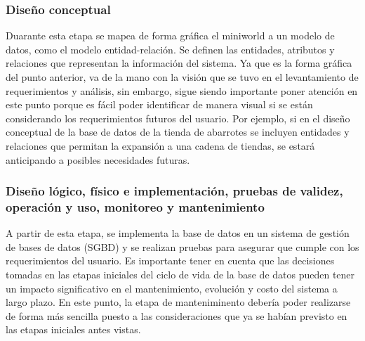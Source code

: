 \vspace{0.3cm}

\subsubsection*{\textcolor{unamblue}{Diseño conceptual}}
Duarante esta etapa se mapea de forma gráfica el miniworld a un modelo de datos, como el modelo entidad-relación. Se definen las entidades, atributos y relaciones que representan la información del sistema.
Ya que es la forma gráfica del punto anterior, va de la mano con la visión que se tuvo en el levantamiento de requerimientos y análisis, sin embargo, sigue siendo importante poner atención en este punto porque es fácil
poder identificar de manera visual si se están considerando los requerimientos futuros del usuario. Por ejemplo, si en el diseño conceptual de la base de datos de la tienda de abarrotes se incluyen entidades y relaciones
que permitan la expansión a una cadena de tiendas, se estará anticipando a posibles necesidades futuras.

 \vspace{0.3cm}

\subsubsection*{\textcolor{unamblue}{Diseño lógico, físico e implementación, pruebas de validez, operación y uso, monitoreo y mantenimiento}}
A partir de esta etapa, se implementa la base de datos en un sistema de gestión de bases de datos (SGBD) y se realizan pruebas para asegurar que cumple con los requerimientos del usuario.
Es importante tener en cuenta que las decisiones tomadas en las etapas iniciales del ciclo de vida de la base de datos pueden tener un impacto significativo en el mantenimiento,
evolución y costo del sistema a largo plazo. 
En este punto, la etapa de manteniminento debería poder realizarse de forma más sencilla puesto a las consideraciones que ya se habían
previsto en las etapas iniciales antes vistas.

